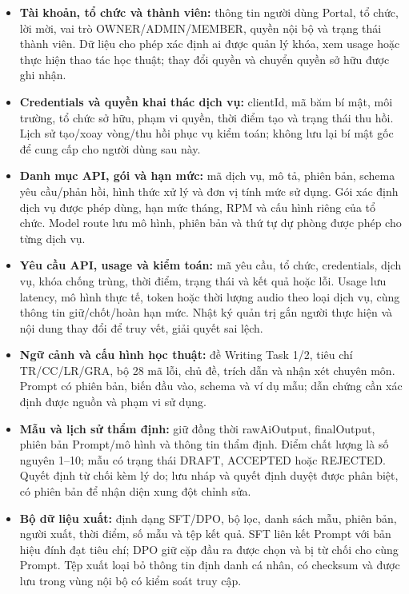 \begin{itemize}
\item \textbf{Tài khoản, tổ chức và thành viên:} thông tin người dùng Portal, tổ chức, lời mời, vai trò OWNER/ADMIN/MEMBER, quyền nội bộ và trạng thái thành viên. Dữ liệu cho phép xác định ai được quản lý khóa, xem usage hoặc thực hiện thao tác học thuật; thay đổi quyền và chuyển quyền sở hữu được ghi nhận.

\item \textbf{Credentials và quyền khai thác dịch vụ:} clientId, mã băm bí mật, môi trường, tổ chức sở hữu, phạm vi quyền, thời điểm tạo và trạng thái thu hồi. Lịch sử tạo/xoay vòng/thu hồi phục vụ kiểm toán; không lưu lại bí mật gốc để cung cấp cho người dùng sau này.

\item \textbf{Danh mục API, gói và hạn mức:} mã dịch vụ, mô tả, phiên bản, schema yêu cầu/phản hồi, hình thức xử lý và đơn vị tính mức sử dụng. Gói xác định dịch vụ được phép dùng, hạn mức tháng, RPM và cấu hình riêng của tổ chức. Model route lưu mô hình, phiên bản và thứ tự dự phòng được phép cho từng dịch vụ.

\item \textbf{Yêu cầu API, usage và kiểm toán:} mã yêu cầu, tổ chức, credentials, dịch vụ, khóa chống trùng, thời điểm, trạng thái và kết quả hoặc lỗi. Usage lưu latency, mô hình thực tế, token hoặc thời lượng audio theo loại dịch vụ, cùng thông tin giữ/chốt/hoàn hạn mức. Nhật ký quản trị gắn người thực hiện và nội dung thay đổi để truy vết, giải quyết sai lệch.

\item \textbf{Ngữ cảnh và cấu hình học thuật:} đề Writing Task 1/2, tiêu chí TR/CC/LR/GRA, bộ 28 mã lỗi, chủ đề, trích dẫn và nhận xét chuyên môn. Prompt có phiên bản, biến đầu vào, schema và ví dụ mẫu; dẫn chứng cần xác định được nguồn và phạm vi sử dụng.

\item \textbf{Mẫu và lịch sử thẩm định:} giữ đồng thời rawAiOutput, finalOutput, phiên bản Prompt/mô hình và thông tin thẩm định. Điểm chất lượng là số nguyên 1--10; mẫu có trạng thái DRAFT, ACCEPTED hoặc REJECTED. Quyết định từ chối kèm lý do; lưu nháp và quyết định duyệt được phân biệt, có phiên bản để nhận diện xung đột chỉnh sửa.

\item \textbf{Bộ dữ liệu xuất:} định dạng SFT/DPO, bộ lọc, danh sách mẫu, phiên bản, người xuất, thời điểm, số mẫu và tệp kết quả. SFT liên kết Prompt với bản hiệu đính đạt tiêu chí; DPO giữ cặp đầu ra được chọn và bị từ chối cho cùng Prompt. Tệp xuất loại bỏ thông tin định danh cá nhân, có checksum và được lưu trong vùng nội bộ có kiểm soát truy cập.
\end{itemize}

